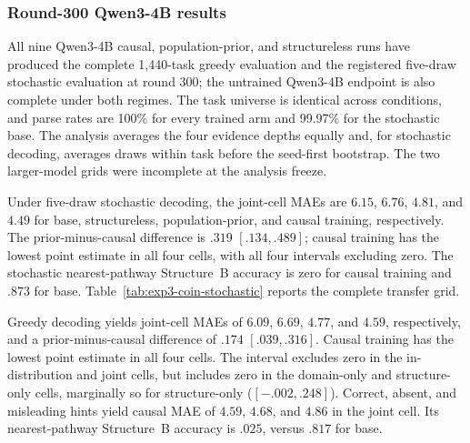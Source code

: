 \subsubsection{Round-300 Qwen3-4B results}
\label{app:exp3-coin-qwen4b}

All nine Qwen3-4B causal, population-prior, and structureless runs have produced
the complete 1,440-task greedy evaluation and the registered five-draw stochastic
evaluation at round 300; the untrained Qwen3-4B endpoint is also complete under
both regimes. The task universe is identical across conditions, and parse rates
are 100\% for every trained arm and 99.97\% for the stochastic base. The analysis
averages the four evidence depths equally and, for stochastic decoding, averages
draws within task before the seed-first bootstrap. The two larger-model grids
were incomplete at the analysis freeze.

Under five-draw stochastic decoding, the joint-cell MAEs are $6.15$, $6.76$,
$4.81$, and $4.49$ for base, structureless, population-prior, and causal training,
respectively. The prior-minus-causal difference is $.319$ $[.134,.489]$; causal
training has the lowest point estimate in all four cells, with all four intervals
excluding zero. The stochastic nearest-pathway Structure~B accuracy is zero for
causal training and $.873$ for base. Table~\ref{tab:exp3-coin-stochastic} reports
the complete transfer grid.

\begin{center}
\begin{minipage}{\linewidth}
\centering
{}
\label{tab:exp3-coin-stochastic}
\scriptsize
\setlength{\tabcolsep}{2.5pt}
\resizebox{\linewidth}{!}{}
\end{minipage}
\end{center}

Greedy decoding yields joint-cell MAEs of $6.09$, $6.69$, $4.77$, and $4.59$,
respectively, and a prior-minus-causal difference of $.174$ $[.039,.316]$. Causal
training has the lowest point estimate in all four cells. The interval excludes
zero in the in-distribution and joint cells, but includes zero in the domain-only
and structure-only cells, marginally so for structure-only ($[-.002,.248]$).
Correct, absent, and misleading hints yield causal MAE of $4.59$, $4.68$, and
$4.86$ in the joint cell. Its nearest-pathway Structure~B accuracy is $.025$,
versus $.817$ for base.

